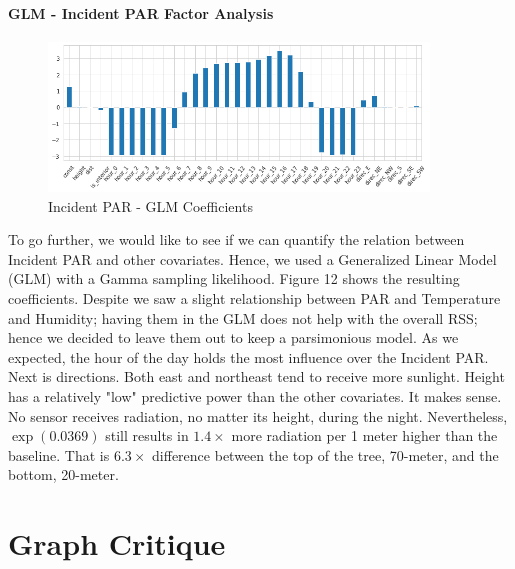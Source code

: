 \documentclass[11pt, letterpaper]{article}
\begin{document}
\paragraph{GLM - Incident PAR Factor Analysis}
\begin{figure}[h!]
\centering
\includegraphics[width=0.9\textwidth]{eda_3.5.png}
\captionsetup{justification=centering}
\caption{Incident PAR - GLM Coefficients}
\end{figure}
To go further, we would like to see if we can quantify the relation between Incident PAR and other covariates. Hence, we used a Generalized Linear Model (GLM) with a Gamma sampling likelihood. Figure 12 shows the resulting coefficients. Despite we saw a slight relationship between PAR and Temperature and Humidity; having them in the GLM does not help with the overall RSS; hence we decided to leave them out to keep a parsimonious model. As we expected, the hour of the day holds the most influence over the Incident PAR. Next is directions. Both east and northeast tend to receive more sunlight. Height has a relatively "low" predictive power than the other covariates. It makes sense. No sensor receives radiation, no matter its height, during the night. Nevertheless, $\exp(0.0369)$ still results in $1.4\times$ more radiation per 1 meter higher than the baseline. That is $6.3\times$ difference between the top of the tree, 70-meter, and the bottom, 20-meter.

\section{Graph Critique}
\end{document}

